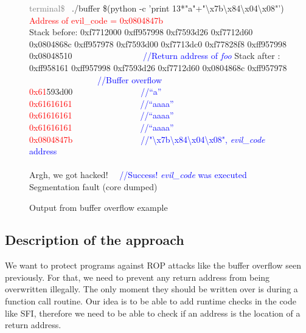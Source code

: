 \documentclass[11pt]{sdm}
\begin{document}
\begin{figure}[!ht]
\textcolor{gray}{terminal\$~} ./buffer \$(python -c 'print 13*"a"+"\textbackslash{x7b}\textbackslash{x84}\textbackslash{x04}\textbackslash{x08}"') \\
\textcolor{red}{Address of evil\_code = 0x0804847b} \\
Stack before: \hfill \break
0xf7712000    \hfill \break
0xff957998    \hfill \break
0xf7593d26    \hfill \break
0xf7712d60    \hfill \break
0x0804868c    \hfill \break
0xff957978    \hfill \break
0xf7593d00    \hfill \break
0xf7713dc0    \hfill \break
0xf77828f8    \hfill \break
0xff957998    \hfill \break
0x08048510    ~~~~~~~~~~~~~~~~\textcolor{blue}{//Return address of \textit{foo}}\hfill \break
              \hfill \break
Stack after : \hfill \break
0xff958161    \hfill \break
0xff957998    \hfill \break
0xf7593d26    \hfill \break
0xf7712d60    \hfill \break
0x0804868c    \hfill \break
0xff957978   			   ~~~~~~~~~~~~~~~~\textcolor{blue}{//Buffer overflow}\hfill \break
\textcolor{red}{0x61}593d00~~~~~~~~~~~~~~~~\textcolor{blue}{//``a''   } \hfill \break
\textcolor{red}{0x61616161}~~~~~~~~~~~~~~~~\textcolor{blue}{//``aaaa''} \hfill \break
\textcolor{red}{0x61616161}~~~~~~~~~~~~~~~~\textcolor{blue}{//``aaaa''} \hfill \break
\textcolor{red}{0x61616161}~~~~~~~~~~~~~~~~\textcolor{blue}{//``aaaa''} \hfill \break
\textcolor{red}{0x0804847b}~~~~~~~~~~~~~~~~\textcolor{blue}{//"\textbackslash{x7b}\textbackslash{x84}\textbackslash{x04}\textbackslash{x08}",  \textit{evil\_code} address \\}
\\
Argh, we got hacked! ~~\textcolor{blue}{//Success! \textit{evil\_code} was executed}\\
Segmentation fault (core dumped)
\caption{Output from buffer overflow example}
\label{output_buffer}
\end{figure}


\subsection{Description of the approach}
\label{sub:Description of the approach}
	We want to protect programs against ROP attacks like the buffer overflow seen previously. For that, we need to prevent any return address from being overwritten illegally. The only moment they should be written over is during a function call routine.
Our idea is to be able to add runtime checks in the code like SFI, therefore we need to be able to check if an address is the location of a return address. 
\end{document}

